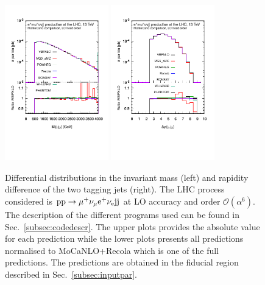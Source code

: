  \begin{figure}[htb!]
   \centering
   \includegraphics[width=0.4\textwidth,angle=0,clip=true,trim={0.4cm 2cm 0.cm 1.cm}]{figures/LO/mjj_LO.pdf}
   \includegraphics[width=0.4\textwidth,angle=0,clip=true,trim={0.4cm 2cm 0.cm 1.cm}]{figures/LO/dyj1j2_LO.pdf}
\caption{\label{fig:wg1_mjj-llLO} Differential distributions in the invariant mass (left) and rapidity difference of the two tagging jets (right).
The LHC process considered is ${\rm p}{\rm p}\to\mu^+\nu_\mu{\rm e}^+\nu_{\rm e}{\rm j}{\rm j}$ at LO accuracy and order $\mathcal{O}(\alpha^6)$.
The description of the different programs used can be found in Sec.~\ref{subsec:codedescr}.
The upper plots provides the absolute value for each prediction while the lower plots presents all predictions normalised to {\sc MoCaNLO}+{\sc Recola} which is one of the full predictions.
The predictions are obtained in the fiducial region described in Sec.~\ref{subsec:inputpar}.
}
\end{figure}
